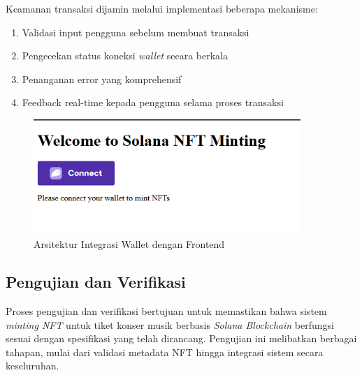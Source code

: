 Keamanan transaksi dijamin melalui implementasi beberapa mekanisme:
\begin{enumerate}
   \item Validasi input pengguna sebelum membuat transaksi
   \item Pengecekan status koneksi \textit{wallet} secara berkala
   \item Penanganan error yang komprehensif
   \item Feedback real-time kepada pengguna selama proses transaksi
\end{enumerate}

\begin{figure}[H]
   \centering
   \includegraphics[width=0.9\textwidth]{gambar/3.2.3.png}
   \caption{Arsitektur Integrasi Wallet dengan Frontend \parencite{ref5}}
   \label{fig:wallet-integration}
\end{figure}


\subsection{Pengujian dan Verifikasi}
Proses pengujian dan verifikasi bertujuan untuk memastikan bahwa sistem \textit{minting NFT} untuk tiket konser musik berbasis \textit{Solana Blockchain} berfungsi sesuai dengan spesifikasi yang telah dirancang. Pengujian ini melibatkan berbagai tahapan, mulai dari validasi metadata NFT hingga integrasi sistem secara keseluruhan.

